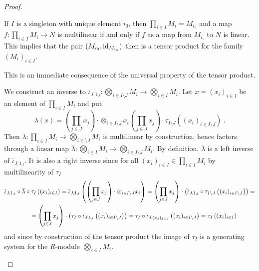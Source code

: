 \begin{proof}
\begin{adromanlist}
  If $I$ is a singleton with unique element $i_0$, then $\prod_{i\in I} M_i = M_{i_0}$ 
  and a map $f: \prod_{i\in I} M_i \to N$ is multilinear if and only if $f$ as a map from $M_{i_\circ}$ to $N$ 
  is linear. This implies that the pair $(M_{i_0},\mathrm{id}_{M_{i_\circ}})$ then is a tensor product 
  for the family $(M_i)_{i\in I}$. 
\item This is an immediate consequence of the universal property of the tensor product.
\item
  We construct an inverse to
  $\overline{\iota}_{J,1_J}: \bigotimes_{i\in I\setminus J}M_i \to  \bigotimes_{i\in I}M_i $.
  Let $x = (x_i)_{i\in I}$ be an element of $\prod_{i\in I}M_i$ and put
  \[
    \lambda (x) =  \left( \prod_{j\in J} x_j \right)\cdot \otimes_{i\in I\setminus J} x_i
    \left( \prod_{j\in J} x_j \right) \cdot \tau_{I\setminus J} ((x_i)_{i\in I\setminus J}) \ .
  \]
  Then $\lambda : \prod_{i\in I}M_i \to \bigotimes_{i\in \setminus J} M_i$
  is multilinear by construction, hence factors through a linear map
  $\overline{\lambda} : \bigotimes_{i\in I}M_i \to \bigotimes_{i\in I \setminus J} M_i$.
  By definition, $\overline{\lambda}$ is a left inverse of $\overline{\iota}_{J,1_J}$. It is also a
  right inverse since for all $(x_i)_{i\in I} \in \prod_{i\in I}M_i$  by multilinearity of $\tau_I$  
  \begin{equation*}
  \begin{split}
     \overline{\iota}_{J,1_J} \circ  \overline{\lambda}\circ  \tau_I  \left( (x_i)_{i\in I} \right) &  =
    \overline{\iota}_{J,1_J}
    \left( \left( \prod_{j\in J} x_j \right) \cdot  \otimes_{i\in I\setminus J} x_i \right)
    =\left( \prod_{j\in J} x_j\right)\cdot\left( \overline{\iota}_{J,1_J} \circ \tau_{I\setminus J}
    \left((x_i)_{i\in I\setminus J}\right)\right) = \\ & \hspace{-5em}
    =\left( \prod_{j\in J} x_j\right)\cdot\left( \tau_I \circ 
    \iota_{J,1_J}\left( (x_i)_{i\in I\setminus J}\right)\right) =
    \tau_I \circ \iota_{J,(x_j)_{j\in J}}\left( (x_i)_{i\in I\setminus J}\right) =
    \tau_I \left( (x_i)_{i\in I}\right) %
  \end{split}
  \end{equation*}
  and since by construction of the tensor product the image of $\tau_I$ is a generating system for
  the $R$-module $\bigotimes_{i\in I}M_i$.
\end{adromanlist}
\end{proof}

